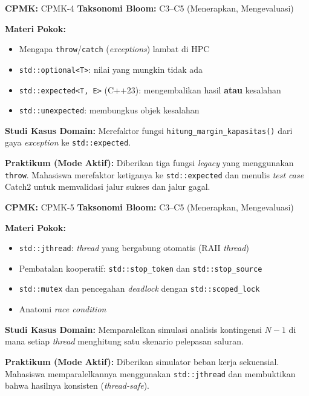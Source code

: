 \documentclass[12pt,a4paper]{article}
\begin{document}
\begin{tcolorbox}[colback=white, colframe=uniblue, title={\textbf{Minggu 12: Penanganan Kesalahan Modern (\texttt{std::expected})}}, fonttitle=\bfseries\color{white}, coltitle=white, colbacktitle=uniblue]
\textbf{CPMK:} CPMK-4 \hfill \textbf{Taksonomi Bloom:} C3--C5 (Menerapkan, Mengevaluasi)

\textbf{Materi Pokok:}
\begin{itemize}[nosep]
    \item Mengapa \texttt{throw}/\texttt{catch} (\textit{exceptions}) lambat di HPC
    \item \texttt{std::optional<T>}: nilai yang mungkin tidak ada
    \item \texttt{std::expected<T, E>} (C++23): mengembalikan hasil \textbf{atau} kesalahan
    \item \texttt{std::unexpected}: membungkus objek kesalahan
\end{itemize}

\textbf{Studi Kasus Domain:}
Merefaktor fungsi \texttt{hitung\_margin\_kapasitas()} dari gaya \textit{exception} ke \texttt{std::expected}.

\textbf{Praktikum (Mode Aktif):}
Diberikan tiga fungsi \textit{legacy} yang menggunakan \texttt{throw}. Mahasiswa merefaktor ketiganya ke \texttt{std::expected} dan menulis \textit{test case} Catch2 untuk memvalidasi jalur sukses dan jalur gagal.
\end{tcolorbox}

\begin{tcolorbox}[colback=white, colframe=uniblue, title={\textbf{Minggu 13: Konkurensi Modern I --- \texttt{std::jthread} \& Sinkronisasi}}, fonttitle=\bfseries\color{white}, coltitle=white, colbacktitle=uniblue]
\textbf{CPMK:} CPMK-5 \hfill \textbf{Taksonomi Bloom:} C3--C5 (Menerapkan, Mengevaluasi)

\textbf{Materi Pokok:}
\begin{itemize}[nosep]
    \item \texttt{std::jthread}: \textit{thread} yang bergabung otomatis (RAII \textit{thread})
    \item Pembatalan kooperatif: \texttt{std::stop\_token} dan \texttt{std::stop\_source}
    \item \texttt{std::mutex} dan pencegahan \textit{deadlock} dengan \texttt{std::scoped\_lock}
    \item Anatomi \textit{race condition}
\end{itemize}

\textbf{Studi Kasus Domain:}
Memparalelkan simulasi analisis kontingensi $N-1$ di mana setiap \textit{thread} menghitung satu skenario pelepasan saluran.

\textbf{Praktikum (Mode Aktif):}
Diberikan simulator beban kerja sekuensial. Mahasiswa memparalelkannya menggunakan \texttt{std::jthread} dan membuktikan bahwa hasilnya konsisten (\textit{thread-safe}).
\end{tcolorbox}
\end{document}
